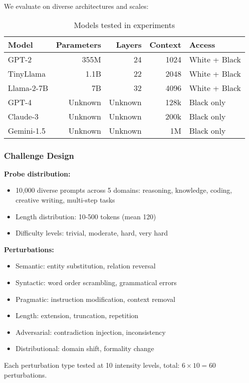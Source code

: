 \documentclass[11pt,a4paper]{article}
\begin{document}
We evaluate on diverse architectures and scales:

\begin{table}[h]
\centering
\caption{Models tested in experiments}
\label{tab:models}
\begin{tabular}{lrrrl}
\toprule
Model & Parameters & Layers & Context & Access \\
\midrule
GPT-2 & 355M & 24 & 1024 & White + Black \\
TinyLlama & 1.1B & 22 & 2048 & White + Black \\
Llama-2-7B & 7B & 32 & 4096 & White + Black \\
GPT-4 & Unknown & Unknown & 128k & Black only \\
Claude-3 & Unknown & Unknown & 200k & Black only \\
Gemini-1.5 & Unknown & Unknown & 1M & Black only \\
\bottomrule
\end{tabular}
\end{table}

\subsubsection{Challenge Design}

\textbf{Probe distribution:}
\begin{itemize}
\item 10,000 diverse prompts across 5 domains: reasoning, knowledge, coding, creative writing, multi-step tasks
\item Length distribution: 10-500 tokens (mean 120)
\item Difficulty levels: trivial, moderate, hard, very hard
\end{itemize}

\textbf{Perturbations:}
\begin{itemize}
\item Semantic: entity substitution, relation reversal
\item Syntactic: word order scrambling, grammatical errors
\item Pragmatic: instruction modification, context removal
\item Length: extension, truncation, repetition
\item Adversarial: contradiction injection, inconsistency
\item Distributional: domain shift, formality change
\end{itemize}

Each perturbation type tested at 10 intensity levels, total: $6 \times 10 = 60$ perturbations.
\end{document}

